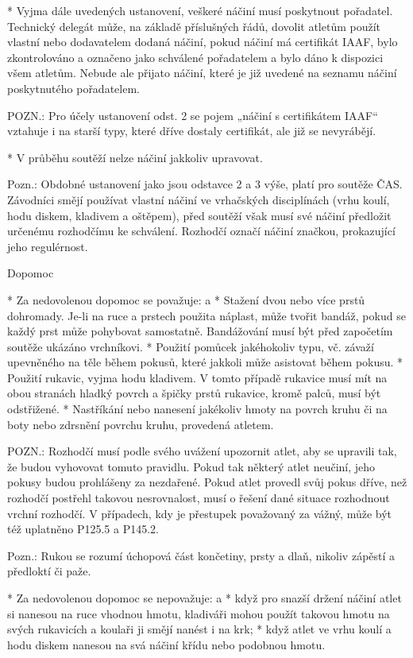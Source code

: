 * Vyjma dále uvedených ustanovení, veškeré náčiní musí poskytnout pořadatel. Technický delegát může, na základě příslušných řádů, dovolit atletům použít vlastní nebo dodavatelem dodaná náčiní, pokud náčiní má certifikát IAAF, bylo zkontrolováno a označeno jako schválené pořadatelem a bylo dáno k dispozici všem atletům. Nebude ale přijato náčiní, které je již uvedené na seznamu náčiní poskytnutého pořadatelem.

POZN.: Pro účely ustanovení odst. 2 se pojem „náčiní s certifikátem IAAF“ vztahuje i na starší typy, které dříve dostaly certifikát, ale již se nevyrábějí.

* V průběhu soutěží nelze náčiní jakkoliv upravovat.

Pozn.:  Obdobné ustanovení jako jsou odstavce 2 a 3 výše, platí pro soutěže ČAS. Závodníci smějí používat vlastní náčiní ve vrhačských disciplínách (vrhu koulí, hodu diskem, kladivem a oštěpem), před soutěží však musí své náčiní předložit určenému rozhodčímu ke schválení. Rozhodčí označí náčiní značkou, prokazující jeho regulérnost.

Dopomoc

* Za nedovolenou dopomoc se považuje:
  \begitems \style a
  * Stažení dvou nebo více prstů dohromady. Je-li na ruce a prstech použita náplast, může tvořit bandáž, pokud se každý prst může pohybovat samostatně. Bandážování musí být před započetím soutěže ukázáno vrchníkovi.
  * Použití pomůcek jakéhokoliv typu, vč. závaží upevněného na těle během pokusů, které jakkoli může asistovat během pokusu.
  * Použití rukavic, vyjma hodu kladivem. V tomto případě rukavice musí mít na obou stranách hladký povrch a špičky prstů rukavice, kromě palců, musí být odstřižené.
  * Nastříkání nebo nanesení jakékoliv hmoty na povrch kruhu či na boty nebo zdrsnění povrchu kruhu, provedená atletem.
  \enditems

POZN.: Rozhodčí musí podle svého uvážení upozornit atlet, aby se upravili tak, že budou vyhovovat tomuto pravidlu. Pokud tak některý atlet neučiní, jeho pokusy budou prohlášeny za nezdařené. Pokud atlet provedl svůj pokus dříve, než rozhodčí postřehl takovou nesrovnalost, musí o řešení dané situace rozhodnout vrchní rozhodčí. V případech, kdy je přestupek považovaný za vážný, může být též uplatněno P125.5 a P145.2.

Pozn.: Rukou se rozumí úchopová část končetiny, prsty a dlaň, nikoliv zápěstí a předloktí či paže.

* Za nedovolenou dopomoc se nepovažuje:
  \begitems \style a
  * když pro snazší držení náčiní atlet si nanesou na ruce vhodnou hmotu, kladiváři mohou použít takovou hmotu na svých rukavicích a koulaři ji smějí nanést i na krk;
  * když atlet ve vrhu koulí a hodu diskem nanesou na svá náčiní křídu nebo podobnou hmotu.

